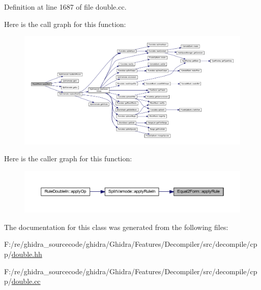 Definition at line 1687 of file double.\+cc.

Here is the call graph for this function\+:
\nopagebreak
\begin{figure}[H]
\begin{center}
\leavevmode
\includegraphics[width=350pt]{class_equal2_form_a72028a6dd8b4d87ed6a6f2139f50775c_cgraph}
\end{center}
\end{figure}
Here is the caller graph for this function\+:
\nopagebreak
\begin{figure}[H]
\begin{center}
\leavevmode
\includegraphics[width=350pt]{class_equal2_form_a72028a6dd8b4d87ed6a6f2139f50775c_icgraph}
\end{center}
\end{figure}


The documentation for this class was generated from the following files\+:\begin{DoxyCompactItemize}
\item 
F\+:/re/ghidra\+\_\+sourcecode/ghidra/\+Ghidra/\+Features/\+Decompiler/src/decompile/cpp/\mbox{\hyperlink{double_8hh}{double.\+hh}}\item 
F\+:/re/ghidra\+\_\+sourcecode/ghidra/\+Ghidra/\+Features/\+Decompiler/src/decompile/cpp/\mbox{\hyperlink{double_8cc}{double.\+cc}}\end{DoxyCompactItemize}
